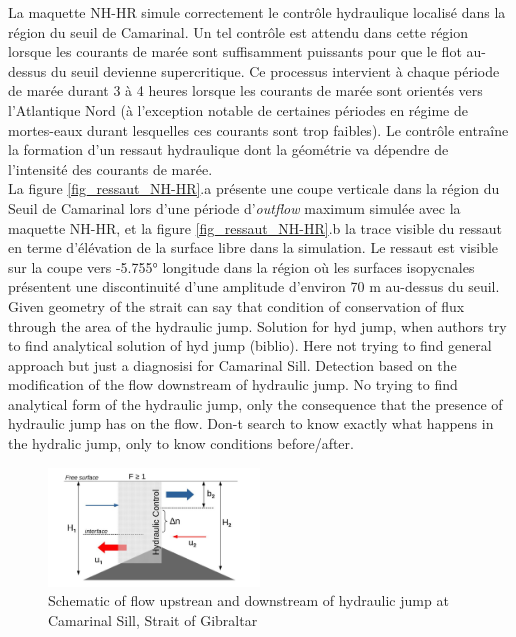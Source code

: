 La maquette NH-HR simule correctement le contrôle hydraulique localisé dans la région du seuil de Camarinal. Un tel contrôle est attendu dans cette région lorsque les courants de marée sont suffisamment puissants pour que le flot au-dessus du seuil devienne supercritique. Ce processus intervient à chaque période de marée durant 3 à 4 heures lorsque les courants de marée sont orientés vers l'Atlantique Nord (à l'exception notable de certaines périodes en régime de mortes-eaux durant lesquelles ces courants sont trop faibles). Le contrôle entraîne la formation d'un ressaut hydraulique dont la géométrie va dépendre de l'intensité des courants de marée. \\
La figure \ref{fig_ressaut_NH-HR}.a présente une coupe verticale dans la région du Seuil de Camarinal lors d'une période d'\textit{outflow} maximum simulée avec la maquette NH-HR, et la figure \ref{fig_ressaut_NH-HR}.b la trace visible du ressaut en terme d'élévation de la surface libre dans la simulation. Le ressaut est visible sur la coupe vers -5.755° longitude dans la région où les surfaces isopycnales présentent une discontinuité d'une amplitude d'environ 70 m au-dessus du seuil.\\


Given geometry of the strait can say that condition of conservation of flux through the area of the hydraulic jump. Solution for hyd jump, when authors try to find analytical solution of hyd jump (biblio). Here not trying to find general approach but just a diagnosisi for Camarinal Sill. Detection based on the modification of the flow downstream of hydraulic jump. No trying to find analytical form of the hydraulic jump, only the consequence that the presence of hydraulic jump has on the flow. Don-t search to know exactly what happens in the hydralic jump, only to know conditions before/after.

\begin{figure}[!h]
 \centering
 \includegraphics[width=0.5\textwidth]{./GBR3D/schema_diagressaut.jpg}
 \caption {Schematic of flow upstrean and downstream of hydraulic jump at Camarinal Sill, Strait of Gibraltar}
  \label{schemaRH}
\end{figure}


